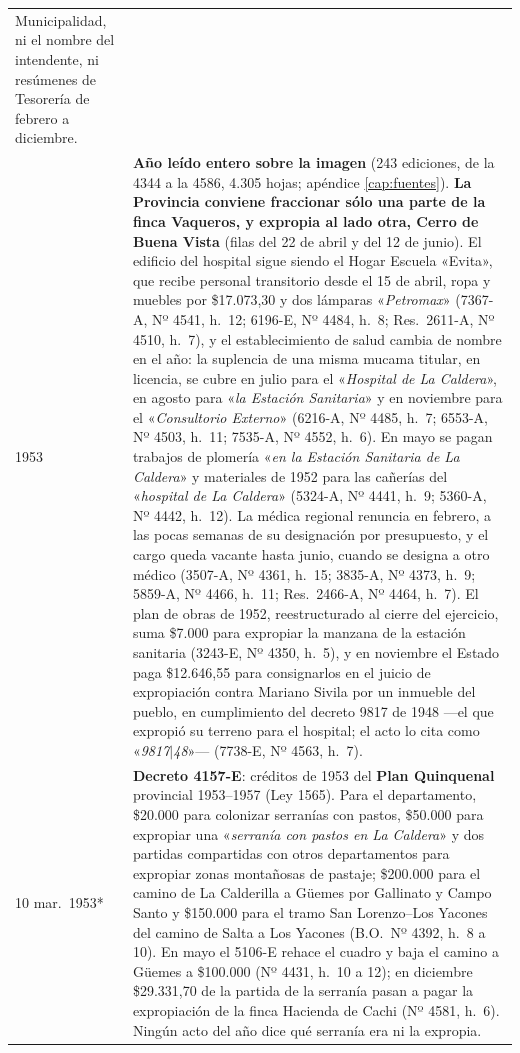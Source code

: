 \begin{longtable}{@{}p{2.7cm}p{10.3cm}@{}}
Municipalidad, ni el nombre del intendente, ni resúmenes de Tesorería de febrero a diciembre. \\
1953 & \textbf{Año leído entero sobre la imagen} (243 ediciones, de la 4344 a la 4586, 4.305 hojas; apéndice \ref{cap:fuentes}). \textbf{La Provincia conviene fraccionar sólo una parte de la finca Vaqueros, y expropia al lado otra, Cerro de Buena Vista} (filas del 22 de abril y del 12 de junio). El edificio del hospital sigue siendo el Hogar Escuela «Evita», que recibe personal transitorio desde el 15 de abril, ropa y muebles por \$17.073,30 y dos lámparas «\textit{Petromax}» (7367-A, Nº 4541, h.\ 12; 6196-E, Nº 4484, h.\ 8; Res.\ 2611-A, Nº 4510, h.\ 7), y el establecimiento de salud cambia de nombre en el año: la suplencia de una misma mucama titular, en licencia, se cubre en julio para el «\textit{Hospital de La Caldera}», en agosto para «\textit{la Estación Sanitaria}» y en noviembre para el «\textit{Consultorio Externo}» (6216-A, Nº 4485, h.\ 7; 6553-A, Nº 4503, h.\ 11; 7535-A, Nº 4552, h.\ 6). En mayo se pagan trabajos de plomería «\textit{en la Estación Sanitaria de La Caldera}» y materiales de 1952 para las cañerías del «\textit{hospital de La Caldera}» (5324-A, Nº 4441, h.\ 9; 5360-A, Nº 4442, h.\ 12). La médica regional renuncia en febrero, a las pocas semanas de su designación por presupuesto, y el cargo queda vacante hasta junio, cuando se designa a otro médico (3507-A, Nº 4361, h.\ 15; 3835-A, Nº 4373, h.\ 9; 5859-A, Nº 4466, h.\ 11; Res.\ 2466-A, Nº 4464, h.\ 7). El plan de obras de 1952, reestructurado al cierre del ejercicio, suma \$7.000 para expropiar la manzana de la estación sanitaria (3243-E, Nº 4350, h.\ 5), y en noviembre el Estado paga \$12.646,55 para consignarlos en el juicio de expropiación contra Mariano Sivila por un inmueble del pueblo, en cumplimiento del decreto 9817 de 1948 ---el que expropió su terreno para el hospital; el acto lo cita como «\textit{9817$|$48}»--- (7738-E, Nº 4563, h.\ 7). \\
10 mar.\ 1953* & \textbf{Decreto 4157-E}: créditos de 1953 del \textbf{Plan Quinquenal} provincial 1953--1957 (Ley 1565). Para el departamento, \$20.000 para colonizar serranías con pastos, \$50.000 para expropiar una «\textit{serranía con pastos en La Caldera}» y dos partidas compartidas con otros departamentos para expropiar zonas montañosas de pastaje; \$200.000 para el camino de La Calderilla a Güemes por Gallinato y Campo Santo y \$150.000 para el tramo San Lorenzo--Los Yacones del camino de Salta a Los Yacones (B.O.\ Nº 4392, h.\ 8 a 10). En mayo el 5106-E rehace el cuadro y baja el camino a Güemes a \$100.000 (Nº 4431, h.\ 10 a 12); en diciembre \$29.331,70 de la partida de la serranía pasan a pagar la expropiación de la finca Hacienda de Cachi (Nº 4581, h.\ 6). Ningún acto del año dice qué serranía era ni la expropia. \\

\end{longtable}
